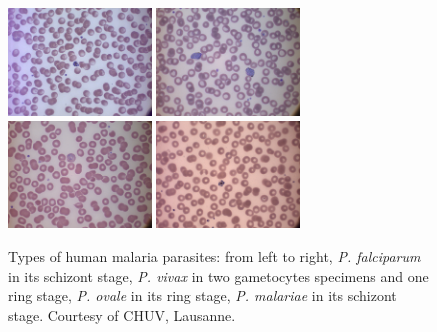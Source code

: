 \documentclass[sensors,review,accept,moreauthors,pdftex,10pt,a4paper]{mdpi}
\begin{document}
\iftrue
\begin{figure}[H]
	\centering
	\includegraphics[width=3.8cm]{img/f2_Pfalciparum}
	\includegraphics[width=3.8cm]{img/f2_Pvivax}
	\includegraphics[width=3.8cm]{img/f2_Povale}
	\includegraphics[width=3.8cm]{img/f2_Pmalariae}
	\caption{\label{fig:malaria_types}Types of human malaria parasites: from left to right, \emph{P. falciparum} in its schizont stage, \emph{P. vivax} in two gametocytes specimens and one ring stage, \emph{P. ovale} in its ring stage, \emph{P. malariae} in its schizont stage.
	Courtesy of CHUV, Lausanne.}
\end{figure}
\fi
\end{document}
